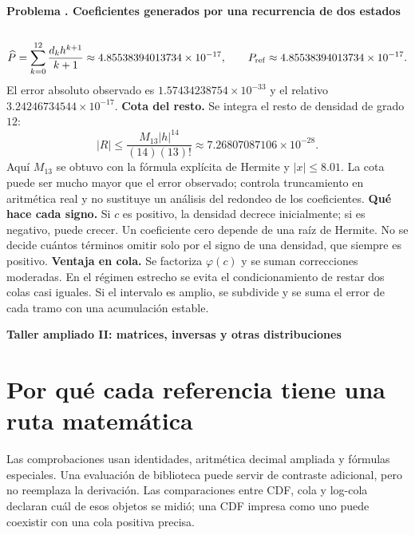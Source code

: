 \documentclass[11pt,a4paper]{article}
\theoremstyle{definition}
\newcommand{\parte}[1]{\par\bigskip\Needspace{8\baselineskip}\begin{center}{\Large\bfseries\color{azul}#1}\end{center}}
\newcounter{problema}
\newenvironment{resuelto}[1]{\refstepcounter{problema}\par\medskip\Needspace{6\baselineskip}\textbf{Problema \theproblema. #1}\par}{\par\medskip}
\begin{document}
\begin{resuelto}{Coeficientes generados por una recurrencia de dos estados}
\begin{center}
\begin{tabular}{rrrr}
\bottomrule\end{tabular}\end{center}
\[
\widehat P=\sum_{k=0}^{12}\frac{d_kh^{k+1}}{k+1}\approx4.85538394013734\times10^{-17},\qquad P_{\rm ref}\approx4.85538394013734\times10^{-17}.
\]
El error absoluto observado es $1.57434238754\times10^{-33}$ y el relativo $3.24246734544\times10^{-17}$.
\textbf{Cota del resto.} Se integra el resto de densidad de grado $12$:
\[
|R|\le\frac{M_{13}|h|^{14}}{(14)(13)!}\approx7.26807087106\times10^{-28}.
\]
Aquí $M_{13}$ se obtuvo con la fórmula explícita de Hermite y $|x|\le8.01$. La cota puede ser mucho mayor que el error observado; controla truncamiento en aritmética real y no sustituye un análisis del redondeo de los coeficientes.
\textbf{Qué hace cada signo.} Si $c$ es positivo, la densidad decrece inicialmente; si es negativo, puede crecer. Un coeficiente cero depende de una raíz de Hermite. No se decide cuántos términos omitir solo por el signo de una densidad, que siempre es positivo.
\textbf{Ventaja en cola.} Se factoriza $\varphi(c)$ y se suman correcciones moderadas. En el régimen estrecho se evita el condicionamiento de restar dos colas casi iguales. Si el intervalo es amplio, se subdivide y se suma el error de cada tramo con una acumulación estable.
\end{resuelto}


\parte{Taller ampliado II: matrices, inversas y otras distribuciones}
\section{Por qué cada referencia tiene una ruta matemática}
Las comprobaciones usan identidades, aritmética decimal ampliada y fórmulas especiales. Una evaluación de biblioteca puede servir de contraste adicional, pero no reemplaza la derivación. Las comparaciones entre CDF, cola y log-cola declaran cuál de esos objetos se midió; una CDF impresa como uno puede coexistir con una cola positiva precisa.
\end{document}
